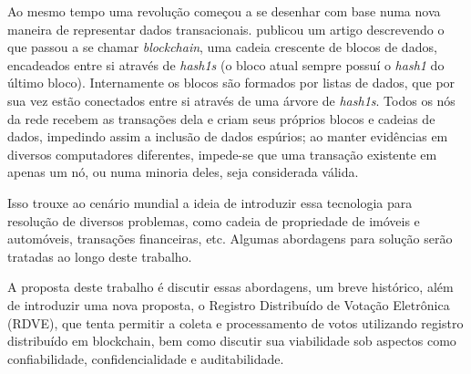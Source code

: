 Ao mesmo tempo uma revolução começou a se desenhar com base numa nova maneira de representar dados transacionais. \cite{Nakamoto2008} publicou um artigo descrevendo o que passou a se chamar \textit{blockchain}, uma cadeia crescente de blocos de dados, encadeados entre si através de \textit{\glspl{hash1}} (o bloco atual sempre possuí o \textit{\gls{hash1}} do último bloco). Internamente os blocos são formados por listas de dados, que por sua vez estão conectados entre si através de uma árvore de \textit{\glspl{hash1}}. Todos os nós da rede recebem as transações dela e criam seus próprios blocos e cadeias de dados, impedindo assim a inclusão de dados espúrios; ao manter evidências em diversos computadores diferentes, impede-se que uma transação existente em apenas um nó, ou numa minoria deles, seja considerada válida. 

Isso trouxe ao cenário mundial a ideia de introduzir essa tecnologia para resolução de diversos problemas, como cadeia de propriedade de imóveis e automóveis, transações financeiras, etc. Algumas abordagens para solução serão tratadas ao longo deste trabalho.  

A proposta deste trabalho é discutir essas abordagens, um breve histórico, além de introduzir uma nova proposta, o Registro Distribuído de Votação Eletrônica (RDVE), que tenta permitir a coleta e processamento de votos utilizando registro distribuído em blockchain, bem como discutir sua viabilidade sob aspectos como confiabilidade, confidencialidade e auditabilidade. 